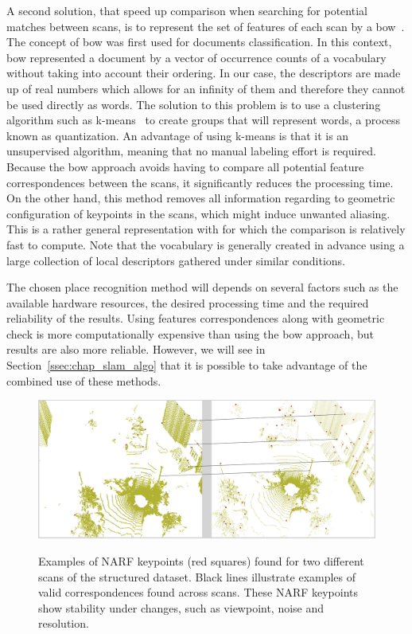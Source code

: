 A second solution, that speed up comparison when searching for potential matches between scans, is to represent the set of features of each scan by a \gls*{bow}~\citep{salton1983mcgill}. The concept of \gls*{bow} was first used for documents classification. In this context, \gls*{bow} represented a document by a vector of occurrence counts of a vocabulary without taking into account their ordering. In our case, the descriptors are made up of real numbers which allows for an infinity of them and therefore they cannot be used directly as words. The solution to this problem is to use a clustering algorithm such as k-means~\citep{MacQueen1967} to create groups that will represent words, a process known as quantization. An advantage of using k-means is that it is an unsupervised algorithm, meaning that no manual labeling effort is required. Because the \gls*{bow} approach avoids having to compare all potential feature correspondences between the scans, it significantly reduces the processing time. On the other hand, this method removes all information regarding to geometric configuration of keypoints in the scans, which might induce unwanted aliasing. This is a rather general representation with for which the comparison is relatively fast to compute. Note that the vocabulary is generally created in advance using a large collection of local descriptors gathered under similar conditions.

The chosen place recognition method will depends on several factors such as the available hardware resources, the desired processing time and the required reliability of the results. Using features correspondences along with geometric check is more computationally expensive than using the \gls*{bow} approach, but results are also more reliable. However, we will see in Section~\ref{ssec:chap_slam_algo} that it is possible to take advantage of the combined use of these methods.

\begin{figure}[H]
    \centering
    \includegraphics[width=0.995\linewidth]{img/chap_slam/features_line.png}\\
    \caption{Examples of NARF keypoints (red squares) found for two different scans of the structured dataset. Black lines illustrate examples of valid correspondences found across scans. These NARF keypoints show stability under changes, such as viewpoint, noise and resolution.}
    \label{fig:chap_slam_features_correspondences}
\end{figure}


